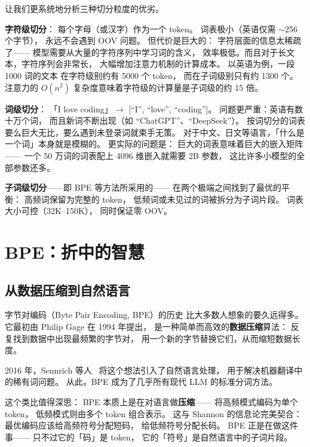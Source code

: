 让我们更系统地分析三种切分粒度的优劣。

\textbf{字符级切分}：
每个字母（或汉字）作为一个 token。
词表极小（英语仅需 $\sim$256 个字节），
永远不会遇到 OOV 问题。
但代价是巨大的：
字符层面的信息太稀疏了——
模型需要从大量的字符序列中学习词的含义，
效率极低。而且对于长文本，字符序列会非常长，
大幅增加注意力机制的计算成本。
以英语为例，一段 1000 词的文本
在字符级别约有 5000 个 token，
而在子词级别只有约 1300 个。
注意力的 $O(n^2)$ 复杂度意味着字符级的计算量是子词级的约 15 倍。

\textbf{词级切分}：
「I love coding」$\to$ [``I'', ``love'', ``coding'']。
问题更严重：英语有数十万个词，
而且新词不断出现（如 ``ChatGPT''、``DeepSeek''）。
按词切分的词表要么巨大无比，要么遇到未登录词就束手无策。
对于中文、日文等语言，「什么是一个词」本身就是模糊的。
更实际的问题是：
巨大的词表意味着巨大的嵌入矩阵——
一个 50 万词的词表配上 4096 维嵌入就需要 2B 参数，
这比许多小模型的全部参数还多。

\textbf{子词级切分}——即 BPE 等方法所采用的——
在两个极端之间找到了最优的平衡：
高频词保留为完整的 token，
低频词或未见过的词被拆分为子词片段。
词表大小可控（32K--150K），
同时保证零 OOV。

\section{BPE：折中的智慧}

\subsection{从数据压缩到自然语言}

字节对编码（Byte Pair Encoding, BPE）的历史
比大多数人想象的要久远得多。
它最初由 Philip Gage 在 1994 年提出，
是一种简单而高效的\textbf{数据压缩}算法：
反复找到数据中出现最频繁的字节对，
用一个新的字节替换它们，从而缩短数据长度。

2016 年，Sennrich 等人~\cite{sennrich2016bpe}
将这个想法引入了自然语言处理，
用于解决机器翻译中的稀有词问题。
从此，BPE 成为了几乎所有现代 LLM 的标准分词方法。

这个类比值得深思：
BPE 本质上是在对语言做\textbf{压缩}——
将高频模式编码为单个 token，
低频模式则由多个 token 组合表示。
这与 Shannon 的信息论完美契合：
最优编码应该给高频符号分配短码，
给低频符号分配长码。
BPE 正是在做这件事——
只不过它的「码」是 token，
它的「符号」是自然语言中的子词片段。

